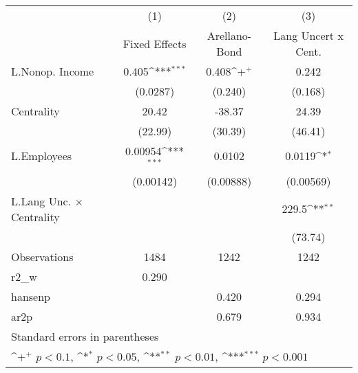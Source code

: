 {
\def\sym#1{\ifmmode^{#1}\else\(^{#1}\)\fi}
\begin{tabular}{l*{3}{c}}
\hline\hline
                    &\multicolumn{1}{c}{(1)}&\multicolumn{1}{c}{(2)}&\multicolumn{1}{c}{(3)}\\
                    &\multicolumn{1}{c}{Fixed Effects}&\multicolumn{1}{c}{Arellano-Bond}&\multicolumn{1}{c}{Lang Uncert x Cent.}\\
\hline
L.Nonop. Income     &       0.405\sym{***}&       0.408\sym{+}  &       0.242         \\
                    &    (0.0287)         &     (0.240)         &     (0.168)         \\
Centrality          &       20.42         &      -38.37         &       24.39         \\
                    &     (22.99)         &     (30.39)         &     (46.41)         \\
L.Employees         &     0.00954\sym{***}&      0.0102         &      0.0119\sym{*}  \\
                    &   (0.00142)         &   (0.00888)         &   (0.00569)         \\
L.Lang Unc. $\times$ Centrality&                     &                     &       229.5\sym{**} \\
                    &                     &                     &     (73.74)         \\
\hline
Observations        &        1484         &        1242         &        1242         \\
r2\_w                &       0.290         &                     &                     \\
hansenp             &                     &       0.420         &       0.294         \\
ar2p                &                     &       0.679         &       0.934         \\
\hline\hline
\multicolumn{4}{l}{\footnotesize Standard errors in parentheses}\\
\multicolumn{4}{l}{\footnotesize \sym{+} \(p<0.1\), \sym{*} \(p<0.05\), \sym{**} \(p<0.01\), \sym{***} \(p<0.001\)}\\
\end{tabular}
}
